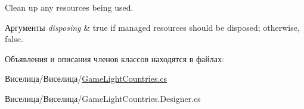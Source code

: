 Clean up any resources being used. 


\begin{DoxyParams}{Аргументы}
{\em disposing} & true if managed resources should be disposed; otherwise, false.\\
\hline
\end{DoxyParams}


Объявления и описания членов классов находятся в файлах\+:\begin{DoxyCompactItemize}
\item 
Виселица/Виселица/\hyperlink{_game_light_countries_8cs}{Game\+Light\+Countries.\+cs}\item 
Виселица/Виселица/Game\+Light\+Countries.\+Designer.\+cs\end{DoxyCompactItemize}
